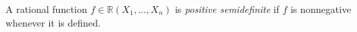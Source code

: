 \documentclass[12pt]{article}
\begin{document}
A rational function $f\in\mathbb{R}(X_1,\ldots,X_n)$ is \emph{positive semidefinite}
if $f$ is nonnegative whenever it is defined. 
\end{document}
